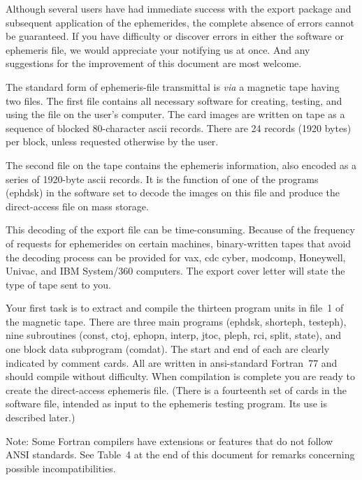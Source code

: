 Although several users have had immediate success with the export
package and subsequent application of the ephemerides, the complete
absence of errors cannot be guaranteed. If you have difficulty
or discover errors in either the software or ephemeris file,
we would appreciate your notifying us at once. And any suggestions
for the improvement of this document are most welcome.
 
The standard form of ephemeris-file transmittal is {\sl via\/}
a magnetic tape having two files. The first file contains
all necessary software for creating, testing, and using the file
on the user's computer. The card images are written on tape as a sequence
of blocked 80-character {\csc ascii} records. There are 24 records
(1920 bytes)
per block, unless requested otherwise by the user.
 
The second file on the tape contains the ephemeris information,
also encoded as a series of 1920-byte {\csc ascii} records.
It is the function of one of the programs ({\csc ephdsk}) in the software
set to decode the images on this file and produce the direct-access
file on mass storage.
 
This decoding of the export file can be
time-consuming. Because of the frequency of requests for ephemerides
on certain machines, binary-written tapes that avoid the
decoding process can be provided for {\csc vax, cdc cyber, modcomp},
Honeywell, Univac, and IBM System/360 computers.
The export cover letter will state the type of tape sent to you.

\pagebreak                                          %
Your first task is to extract and compile the thirteen program units
in file~1 of the magnetic tape. There are three main programs
({\csc ephdsk, shorteph, testeph}),
nine subroutines ({\csc const, ctoj, ephopn, interp, jtoc, pleph,
rci, split, state}), and one block data subprogram ({\csc comdat}).
The start and end of each are clearly indicated
by comment cards. All are written in {\csc ansi}-standard Fortran~77
and should compile without difficulty. When compilation
is complete you are ready
to create the direct-access ephemeris file.
(There is a fourteenth set of cards in the
software file, intended
as input to the ephemeris testing program. Its use is described later.)
 
{\bld Note: Some Fortran compilers have extensions or features that do not
follow ANSI standards. See Table~4 at the end of this document
for remarks concerning possible incompatibilities.}
 
